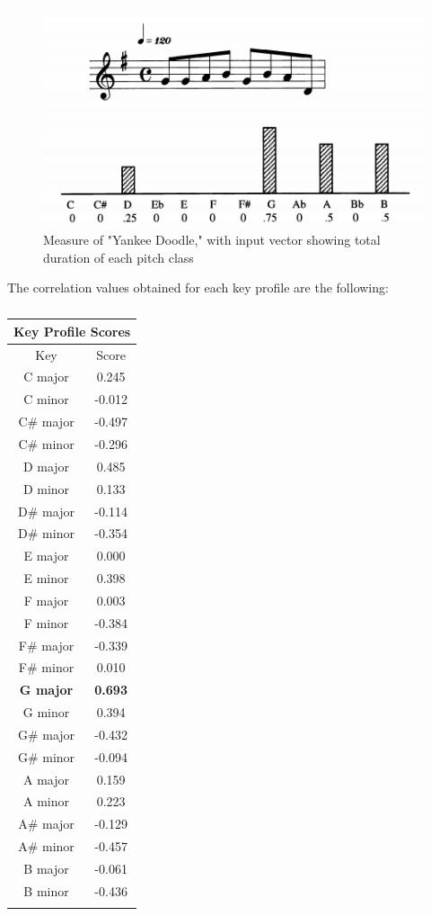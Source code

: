 \begin{figure}[H]
    \centering
    \includegraphics[width=.8\linewidth]{figs/method/yankee_song.png}
    \caption{Measure of "Yankee Doodle," with input vector showing total duration of each pitch class}
    \label{fig:yankee_song}
\end{figure}

The correlation values obtained for each key profile are the following:

\begin{table}[H]
    \centering
    \begin{tabular}{c c}
        \multicolumn{2}{c}{\large{Key Profile Scores}}\\
        \hline
        Key & Score\\
        \hline
        C major & 0.245\\
        C minor & -0.012\\
        C\# major & -0.497\\
        C\# minor & -0.296\\
        D major & 0.485\\
        D minor & 0.133\\
        D\# major & -0.114\\
        D\# minor & -0.354\\
        E major & 0.000\\
        E minor & 0.398\\
        F major & 0.003\\
        F minor & -0.384\\
        F\# major & -0.339\\
        F\# minor & 0.010\\
        \textbf{G major} & \textbf{0.693}\\
        G minor & 0.394\\
        G\# major & -0.432\\
        G\# minor & -0.094\\
        A major & 0.159\\
        A minor & 0.223\\
        A\# major & -0.129\\
        A\# minor & -0.457\\
        B major & -0.061\\
        B minor & -0.436\\
        \hline \\[0.1ex]
    \end{tabular}
    \caption{}
    \label{table:1}
\end{table}

